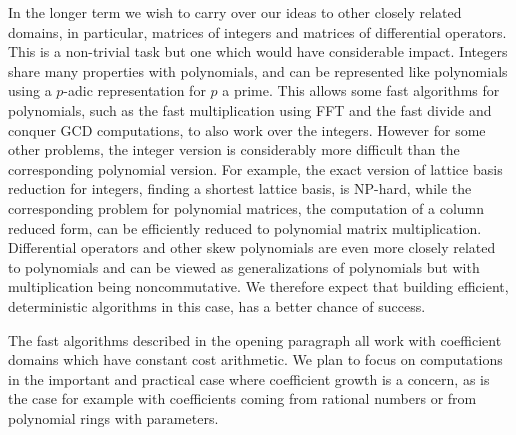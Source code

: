 In the longer term we wish to carry over our ideas to other closely related domains, in particular,  matrices of integers and matrices of differential operators. This is a non-trivial task but one which would have considerable impact. Integers share many properties with polynomials, and can be represented like polynomials using a $p$-adic representation for $p$ a prime. This allows some fast algorithms for polynomials, such as the fast multiplication using FFT and the fast divide and conquer GCD computations, to also work over the integers. However for some other problems, the integer version is considerably more difficult than the corresponding polynomial version. For example, the exact version of lattice basis reduction for integers, finding a shortest lattice basis, is NP-hard, while the corresponding problem for polynomial matrices, the computation of a column reduced form, can be efficiently reduced to polynomial matrix multiplication.
Differential operators and other skew polynomials are even more closely related to polynomials and can be viewed as generalizations of polynomials but with multiplication being noncommutative. 
We therefore expect that building efficient, deterministic algorithms in this case, %
has a better chance of success.

The fast algorithms described in the opening paragraph all work with coefficient domains which have constant cost arithmetic. We plan to focus on computations in the important and practical case where coefficient growth is a concern, as is the case for example with coefficients coming from rational numbers or from polynomial rings with parameters. 
